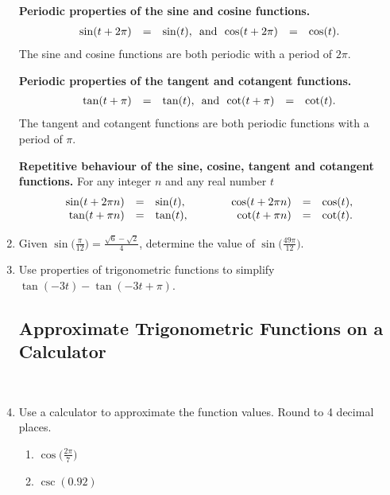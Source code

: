 \begin{enumerate}
\vfill


   \noindent\colorbox{blue!10}{%
   \parbox{\dimexpr\linewidth}%
   {%
     \textbf{Periodic properties of the sine and cosine functions.}
     \begin{eqnarray*}
       \begin{array}{rcl@{~~\textrm{and}~~}rcl}
         \sin(t+2\pi) & = & \sin(t), & \cos(t+2\pi) & = & \cos(t).
       \end{array}
     \end{eqnarray*}
     The sine and cosine functions are both periodic with a period of $2\pi$.
   }
 }
 \noindent\colorbox{blue!10}{%
   \parbox{\dimexpr\linewidth}%
   {%
     \textbf{Periodic properties of the tangent and cotangent functions.}
     \begin{eqnarray*}
       \begin{array}{rcl@{~~\textrm{and}~~}rcl}
         \tan(t+\pi) & = & \tan(t), & \cot(t+\pi) & = & \cot(t).
       \end{array}
     \end{eqnarray*}
     The tangent and cotangent functions are both periodic functions with a period of $\pi$.

     \textbf{Repetitive behaviour of the sine, cosine, tangent and cotangent functions.}
     For any integer $n$ and any real number $t$
     \begin{eqnarray*}
       \begin{array}{rcl@{\hspace{4em}}rcl}
         \sin(t+2\pi n) & = & \sin(t), & \cos(t+2\pi n) & = & \cos(t), \\
         \tan(t+\pi n) & = & \tan(t), & \cot(t+\pi n) & = & \cot(t).
       \end{array}
     \end{eqnarray*}

   }
 }

\newpage
\item Given $\displaystyle \sin\Bigg(\frac{\pi}{12}\Bigg)=\frac{\sqrt{6}-\sqrt{2}}{4}$, determine the value of $\displaystyle \sin \Bigg( \frac{49\pi}{12} \Bigg)$.

\vfill
\item Use properties of trigonometric functions to simplify $\tan(-3t)-\tan(-3t+\pi)$.
\vfill

\subsection{Approximate Trigonometric Functions on a Calculator} ~

\item Use a calculator to approximate the function values.  Round to 4 decimal places.
\begin{enumerate}
\item $\displaystyle \cos \Bigg( \frac{2\pi}{7} \Bigg)$\\
\item $\csc(0.92)$\\[.2in]
\end{enumerate}



\end{enumerate}

